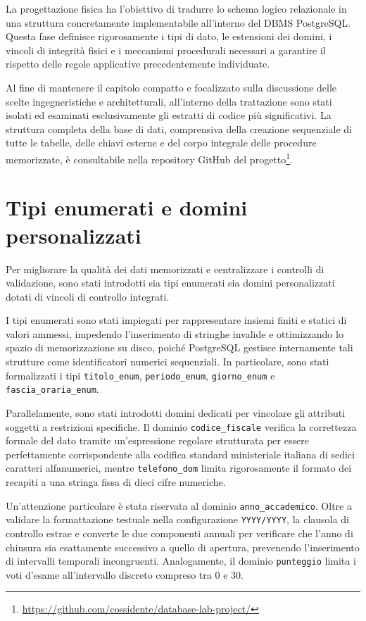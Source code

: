 La progettazione fisica ha l'obiettivo di tradurre lo schema logico relazionale in una struttura concretamente implementabile all'interno del DBMS PostgreSQL. Questa fase definisce rigorosamente i tipi di dato, le estensioni dei domini, i vincoli di integrità fisici e i meccanismi procedurali necessari a garantire il rispetto delle regole applicative precedentemente individuate.

Al fine di mantenere il capitolo compatto e focalizzato sulla discussione delle scelte ingegneristiche e architetturali, all'interno della trattazione sono stati isolati ed esaminati esclusivamente gli estratti di codice più significativi. La struttura completa della base di dati, comprensiva della creazione sequenziale di tutte le tabelle, delle chiavi esterne e del corpo integrale delle procedure memorizzate, è consultabile nella repository GitHub del progetto\footnote{\url{https://github.com/cossidente/database-lab-project/}}.

\section{Tipi enumerati e domini personalizzati}
\label{sec:tipi-enumerati-e-domini-personalizzati}

Per migliorare la qualità dei dati memorizzati e centralizzare i controlli di validazione, sono stati introdotti sia tipi enumerati sia domini personalizzati dotati di vincoli di controllo integrati.

I tipi enumerati sono stati impiegati per rappresentare insiemi finiti e statici di valori ammessi, impedendo l'inserimento di stringhe invalide e ottimizzando lo spazio di memorizzazione su disco, poiché PostgreSQL gestisce internamente tali strutture come identificatori numerici sequenziali.
In particolare, sono stati formalizzati i tipi \texttt{titolo\_enum}, \texttt{periodo\_enum}, \texttt{giorno\_enum} e \texttt{fascia\_oraria\_enum}.

Parallelamente, sono stati introdotti domini dedicati per vincolare gli attributi soggetti a restrizioni specifiche.
Il dominio \texttt{codice\_fiscale} verifica la correttezza formale del dato tramite un'espressione regolare strutturata per essere perfettamente corrispondente alla codifica standard ministeriale italiana di sedici caratteri alfanumerici, mentre \texttt{telefono\_dom} limita rigorosamente il formato dei recapiti a una stringa fissa di dieci cifre numeriche.

Un'attenzione particolare è stata riservata al dominio \texttt{anno\_accademico}. Oltre a validare la formattazione testuale nella configurazione \texttt{YYYY/YYYY}, la clausola di controllo estrae e converte le due componenti annuali per verificare che l'anno di chiusura sia esattamente successivo a quello di apertura, prevenendo l'inserimento di intervalli temporali incongruenti.
Analogamente, il dominio \texttt{punteggio} limita i voti d'esame all'intervallo discreto compreso tra 0 e 30.

